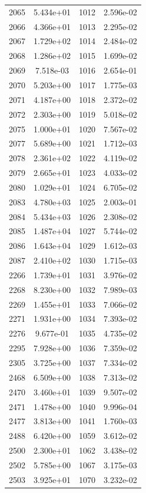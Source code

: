 \documentclass[12pt]{article}
\begin{document}
\begin{longtable}{@{}cccc@{}}
2065 & 5.434e+01 & 1012 & 2.596e-02 \\
2066 & 4.366e+01 & 1013 & 2.295e-02 \\
2067 & 1.729e+02 & 1014 & 2.484e-02 \\
2068 & 1.286e+02 & 1015 & 1.699e-02 \\
2069 & 7.518e-03 & 1016 & 2.654e-01 \\
2070 & 5.203e+00 & 1017 & 1.775e-03 \\
2071 & 4.187e+00 & 1018 & 2.372e-02 \\
2072 & 2.303e+00 & 1019 & 5.018e-02 \\
2075 & 1.000e+01 & 1020 & 7.567e-02 \\
2077 & 5.689e+00 & 1021 & 1.712e-03 \\
2078 & 2.361e+02 & 1022 & 4.119e-02 \\
2079 & 2.665e+01 & 1023 & 4.033e-02 \\
2080 & 1.029e+01 & 1024 & 6.705e-02 \\
2083 & 4.780e+03 & 1025 & 2.003e-01 \\
2084 & 5.434e+03 & 1026 & 2.308e-02 \\
2085 & 1.487e+04 & 1027 & 5.744e-02 \\
2086 & 1.643e+04 & 1029 & 1.612e-03 \\
2087 & 2.410e+02 & 1030 & 1.715e-03 \\
2266 & 1.739e+01 & 1031 & 3.976e-02 \\
2268 & 8.230e+00 & 1032 & 7.989e-03 \\
2269 & 1.455e+01 & 1033 & 7.066e-02 \\
2271 & 1.931e+00 & 1034 & 7.393e-02 \\
2276 & 9.677e-01 & 1035 & 4.735e-02 \\
2295 & 7.928e+00 & 1036 & 7.359e-02 \\
2305 & 3.725e+00 & 1037 & 7.334e-02 \\
2468 & 6.509e+00 & 1038 & 7.313e-02 \\
2470 & 3.460e+01 & 1039 & 9.507e-02 \\
2471 & 1.478e+00 & 1040 & 9.996e-04 \\
2477 & 3.813e+00 & 1041 & 1.760e-03 \\
2488 & 6.420e+00 & 1059 & 3.612e-02 \\
2500 & 2.300e+01 & 1062 & 3.438e-02 \\
2502 & 5.785e+00 & 1067 & 3.175e-03 \\
2503 & 3.925e+01 & 1070 & 3.232e-02 \\

\end{longtable}
\end{document}

